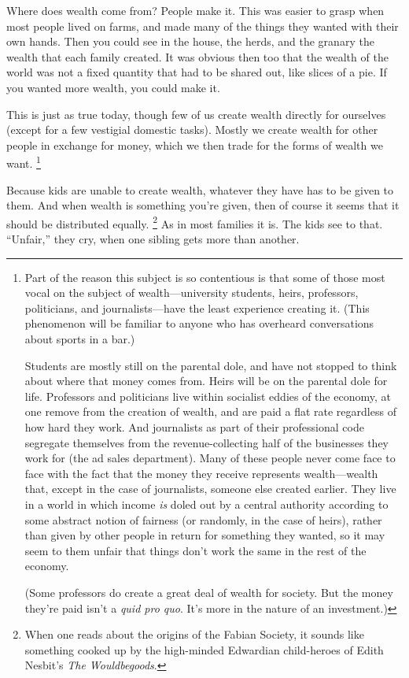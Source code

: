 Where does wealth come from? People make it. This was easier to grasp
when most people lived on farms, and made many of the things they wanted
with their own hands. Then you could see in the house, the herds, and
the granary the wealth that each family created. It was obvious then too
that the wealth of the world was not a fixed quantity that had to be
shared out, like slices of a pie. If you wanted more wealth, you could
make it.

This is just as true today, though few of us create wealth directly for
ourselves (except for a few vestigial domestic tasks). Mostly we create
wealth for other people in exchange for money, which we then trade for
the forms of wealth we want. \footnote{Part of the reason this subject is so contentious is that some
of those most vocal on the subject of wealth---university students,
heirs, professors, politicians, and journalists---have the least
experience creating it. (This phenomenon will be familiar to anyone who
has overheard conversations about sports in a bar.)

Students are mostly still on the parental dole, and have not stopped to
think about where that money comes from. Heirs will be on the parental
dole for life. Professors and politicians live within socialist eddies
of the economy, at one remove from the creation of wealth, and are paid
a flat rate regardless of how hard they work. And journalists as part of
their professional code segregate themselves from the revenue-collecting
half of the businesses they work for (the ad sales department). Many of
these people never come face to face with the fact that the money they
receive represents wealth---wealth that, except in the case of
journalists, someone else created earlier. They live in a world in which
income \emph{is} doled out by a central authority according to some
abstract notion of fairness (or randomly, in the case of heirs), rather
than given by other people in return for something they wanted, so it
may seem to them unfair that things don't work the same in the rest of
the economy.

(Some professors do create a great deal of wealth for society. But the
money they're paid isn't a \emph{quid pro quo}. It's more in the nature
of an investment.)}

Because kids are unable to create wealth, whatever they have has to be
given to them. And when wealth is something you're given, then of course
it seems that it should be distributed equally. \footnote{When one reads about the origins of the Fabian Society, it
sounds like something cooked up by the high-minded Edwardian
child-heroes of Edith Nesbit's \emph{The Wouldbegoods}.}
As in most families it is. The kids see to that. ``Unfair,'' they cry,
when one sibling gets more than another.

